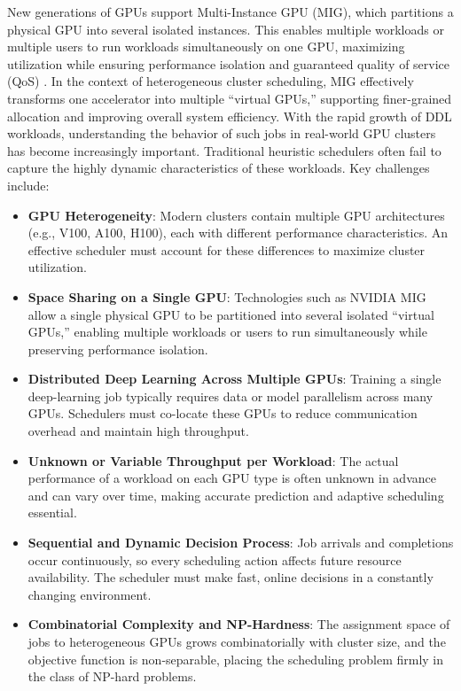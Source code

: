 \documentclass{article}
\begin{document}
New generations of GPUs support Multi-Instance GPU (MIG), which partitions a physical GPU into several isolated instances. 
This enables multiple workloads or multiple users to run workloads simultaneously on one GPU, maximizing utilization while ensuring performance isolation and guaranteed quality of service (QoS) \cite{nvidiaMIG}.
In the context of heterogeneous cluster scheduling, MIG effectively transforms one accelerator into multiple ``virtual GPUs,'' supporting finer-grained allocation and improving overall system efficiency.
With the rapid growth of DDL workloads, understanding the behavior of such jobs in real-world GPU clusters has become increasingly important.  Traditional heuristic schedulers often fail to capture the highly dynamic characteristics of these workloads.  Key challenges include:
\begin{itemize}
  \item \textbf{GPU Heterogeneity}: Modern clusters contain multiple GPU architectures (e.g., V100, A100, H100), each with different performance characteristics.  An effective scheduler must account for these differences to maximize cluster utilization.
  \item \textbf{Space Sharing on a Single GPU}: Technologies such as NVIDIA MIG allow a single physical GPU to be partitioned into several isolated “virtual GPUs,” enabling multiple workloads or users to run simultaneously while preserving performance isolation.
  \item \textbf{Distributed Deep Learning Across Multiple GPUs}: Training a single deep-learning job typically requires data or model parallelism across many GPUs.  Schedulers must co-locate these GPUs to reduce communication overhead and maintain high throughput.
  \item \textbf{Unknown or Variable Throughput per Workload}: The actual performance of a workload on each GPU type is often unknown in advance and can vary over time, making accurate prediction and adaptive scheduling essential.
  \item \textbf{Sequential and Dynamic Decision Process}: Job arrivals and completions occur continuously, so every scheduling action affects future resource availability.  The scheduler must make fast, online decisions in a constantly changing environment.
  \item \textbf{Combinatorial Complexity and NP-Hardness}: The assignment space of jobs to heterogeneous GPUs grows combinatorially with cluster size, and the objective function is non-separable, placing the scheduling problem firmly in the class of NP-hard problems.
\end{itemize}
\end{document}
